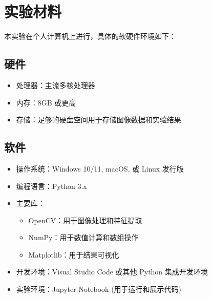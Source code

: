 \section{实验材料}
本实验在个人计算机上进行，具体的软硬件环境如下：

\subsection{硬件}
\begin{itemize}
    \item 处理器：主流多核处理器
    \item 内存：8GB 或更高
    \item 存储：足够的硬盘空间用于存储图像数据和实验结果
\end{itemize}

\subsection{软件}
\begin{itemize}
    \item 操作系统：Windows 10/11, macOS, 或 Linux 发行版
    \item 编程语言：Python 3.x
    \item 主要库：
    \begin{itemize}
        \item OpenCV：用于图像处理和特征提取
        \item NumPy：用于数值计算和数组操作
        \item Matplotlib：用于结果可视化
    \end{itemize}
    \item 开发环境：Visual Studio Code 或其他 Python 集成开发环境
    \item 实验环境：Jupyter Notebook (用于运行和展示代码)
\end{itemize}

